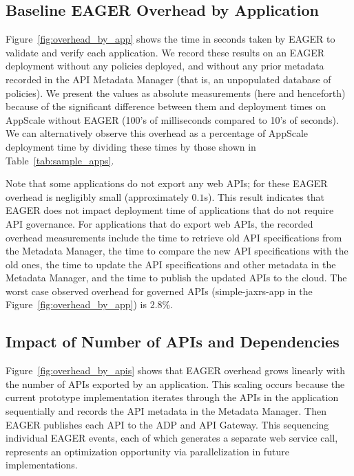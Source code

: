 \subsection{Baseline EAGER Overhead by Application}

Figure~\ref{fig:overhead_by_app} shows the time in seconds taken by EAGER to validate and 
verify each application.  We record these results on an EAGER deployment without any policies 
deployed, and without any prior metadata recorded in the API Metadata Manager 
(that is, an unpopulated database of policies).
We present the values as absolute measurements (here and henceforth) because
of the significant difference between them and 
deployment times on AppScale without EAGER (100's of milliseconds compared to 10's of seconds).  
We can alternatively observe this overhead as a 
percentage of AppScale deployment time by dividing these times by 
those shown in Table~\ref{tab:sample_apps}.

Note that some applications do not export any web APIs;
for these EAGER overhead is negligibly small (approximately $0.1$s). 
This result indicates that EAGER does not impact deployment time of applications 
that do not require API governance.  For applications that do
export web APIs, the recorded overhead measurements include the time
to retrieve old API specifications from the Metadata Manager, the time 
to compare the new API specifications with the old ones, the time to
update the API specifications and other metadata in the Metadata Manager, and
the time to publish the updated APIs to the cloud.  
The worst case observed overhead for governed APIs (simple-jaxrs-app in the
Figure~\ref{fig:overhead_by_app}) is 2.8\%.

\subsection{Impact of Number of APIs and Dependencies}

Figure~\ref{fig:overhead_by_apis} shows that EAGER overhead grows linearly
with the number of APIs exported by an application.  This scaling occurs
because the current prototype implementation iterates through the APIs in the
application sequentially and records the API metadata in the Metadata Manager.
Then EAGER publishes each API to the ADP and API Gateway. This sequencing
individual EAGER events, each of which generates a separate web service call,
represents an optimization opportunity via parallelization in future implementations.

